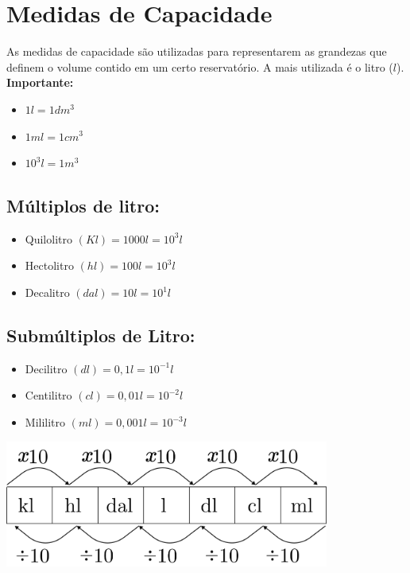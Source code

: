 \section{Medidas de Capacidade}
As medidas de capacidade são utilizadas para representarem
as grandezas que definem o volume contido em um certo
reservatório. A mais utilizada é o litro ($l$).
	\\\textbf{Importante:}
	\begin{itemize}
	    \item $1l = 1dm^3$
	    \item $1 ml = 1 cm^3$
	    \item $10^3 l = 1 m^3$
	\end{itemize}
\begin{multicols}{2}
	\subsection{Múltiplos de litro:}
		\begin{itemize}
		    \item Quilolitro $(Kl) = 1000 l = 10^3 l$
		    \item Hectolitro $(hl) = 100 l = 10^3 l$
		    \item Decalitro $(dal) = 10 l = 10^1l$
		\end{itemize}
	
	\subsection{Submúltiplos de Litro:}
		\begin{itemize}
		    \item Decilitro $(dl) = 0,1 l = 10^{-1}l$
		    \item Centilitro $(cl) = 0,01 l = 10^{-2}l$
		    \item Mililitro $(ml) = 0,001 l = 10^{-3}l$
		\end{itemize}
\columnbreak
     \bigskip
     \noindent   %
     \begin{minipage}{\linewidth}

    \centering 
    \includegraphics[width=0.8\textwidth]{imagens/matematicaBasica/sistemaDeUnidades/MultiplosDeLitro.pdf}
     \end{minipage}
   \end{multicols}  

